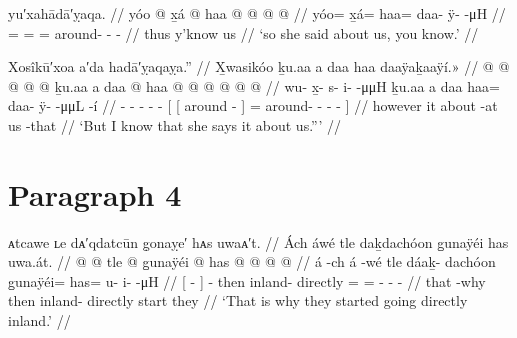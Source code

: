 \ex\label{ex:92-56-so-she-said}%
%
\begingl
	\glpreamble	yu′xahādā′ỵaqa. //
	\gla	yóo @ x̱á @ haa @  @ {} @ {} @ {} //
	\glb	yóo= x̱á= haa= daa- ÿ-  -μH //
	\glc	{}= = = around- -  - //
	\gld	thus y’know\• us  {} {} {} //
	\glft	‘so she said about us, you know.’
		//
\endgl
\xe

\ex\label{ex:92-57-I-know-she-says}%
%
\begingl
	\glpreamble	Xosîkū′xoa a′da hadā′ỵaqaỵa.” //
	\glpreamble	X̱wasikóo ḵu.aa a daa haa daaÿaḵaaÿí.\!» //
	\gla	{} @ {} @ {} @ {} @ {} @ {} ḵu.aa
		{} {} a daa @ {} {}
			haa @  @ {} @ {} @ {} @ {} @ {} //
	\glb	wu- x̱- s- i-  -μμH ḵu.aa
		{} {} a daa {} {}
			haa= daa- ÿ-  -μμL -í {} //
	\glc	{}- - - -  - 
		{}[ {}[  around - {}]
			= around- -  - - {}] //
	\gld	{} {} {} {} {} {} however
		{} {} it about -at {}
			us  {} {} {} -that {} //
	\glft	‘But I know that she says it about us.”’
		//
\endgl
\xe


\section{Paragraph 4}\label{sec:92-para-4}

\ex\label{ex:92-58-why-they-went-directly-inland}%
%
\begingl
	\glpreamble	ᴀtcawe ʟe dᴀ′qdatcūn g̣onaỵe′ hᴀs uwaᴀ′t. //
	\glpreamble	Ách áwé tle daḵdachóon g̱unaÿéi has uwa.át. //
	\gla	{}  @ {} {}  @ {}
		tle  @ {}
		g̱unaÿéi @ has @  @ {} @ {} @ {} //
	\glb	{} á -ch {} á -wé
		tle dáaḵ- dachóon
		g̱unaÿéi= has= u- i-  -μH //
	\glc	{}[  - {}]  -
		then inland- directly
		= = - -  - //
	\gld	{} that -why {}  {}
		then inland- directly
		start they  {} {} {} //
	\glft	‘That is why they started going directly inland.’
		//
\endgl
\xe

